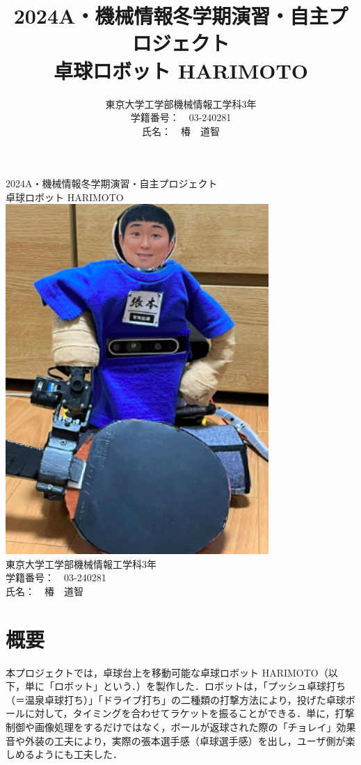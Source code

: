\documentclass[10pt, oneside, titlepage]{ltjsarticle}  %
\title{ \large{2024A・機械情報冬学期演習・自主プロジェクト}\\
\vspace{1cm}
\Huge{卓球ロボット HARIMOTO}}
\author{東京大学工学部機械情報工学科3年 \\
学籍番号：　03-240281 \\
氏名：　椿　道智}
\begin{document}
\begin{titlepage}
  \begin{center}
  \Large{2024A・機械情報冬学期演習・自主プロジェクト}\\
  \vspace{1cm}
  \Huge{卓球ロボット HARIMOTO}\\
  \vspace{1cm}
  \includegraphics[width=10cm]{figures/HARIMOTO.png}\\
  \vspace{2cm}
  \Large{
  東京大学工学部機械情報工学科3年\\
  学籍番号：　03-240281\\
  氏名：　椿　道智
  }
  \end{center}
\end{titlepage}
\section{概要}
本プロジェクトでは，卓球台上を移動可能な卓球ロボット HARIMOTO（以下，単に「ロボット」という．）を製作した．ロボットは，「プッシュ卓球打ち（＝温泉卓球打ち）」「ドライブ打ち」の二種類の打撃方法により，投げた卓球ボールに対して，タイミングを合わせてラケットを振ることができる．単に，打撃制御や画像処理をするだけではなく，ボールが返球された際の「チョレイ」効果音や外装の工夫により，実際の張本選手感（卓球選手感）を出し，ユーザ側が楽しめるようにも工夫した．
\end{document}

